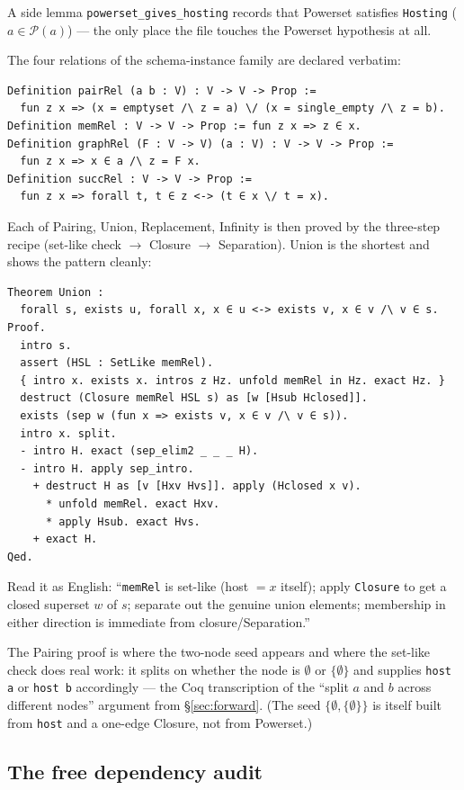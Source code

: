 \documentclass[11pt]{article}
\theoremstyle{plain}
\theoremstyle{definition}
\newcommand{\Pow}{\mathcal{P}}
\newcommand{\cq}[1]{\lstinline[basicstyle=\ttfamily]|#1|}
\begin{document}
A side lemma \cq{powerset_gives_hosting} records that Powerset satisfies
\cq{Hosting} ($a \in \Pow(a)$) --- the only place the file touches the Powerset
hypothesis at all.

The four relations of the schema-instance family are declared verbatim:

\begin{lstlisting}
Definition pairRel (a b : V) : V -> V -> Prop :=
  fun z x => (x = emptyset /\ z = a) \/ (x = single_empty /\ z = b).
Definition memRel : V -> V -> Prop := fun z x => z ∈ x.
Definition graphRel (F : V -> V) (a : V) : V -> V -> Prop :=
  fun z x => x ∈ a /\ z = F x.
Definition succRel : V -> V -> Prop :=
  fun z x => forall t, t ∈ z <-> (t ∈ x \/ t = x).
\end{lstlisting}

Each of Pairing, Union, Replacement, Infinity is then proved by the three-step
recipe (set-like check $\to$ Closure $\to$ Separation). Union is the shortest and
shows the pattern cleanly:

\begin{lstlisting}
Theorem Union :
  forall s, exists u, forall x, x ∈ u <-> exists v, x ∈ v /\ v ∈ s.
Proof.
  intro s.
  assert (HSL : SetLike memRel).
  { intro x. exists x. intros z Hz. unfold memRel in Hz. exact Hz. }
  destruct (Closure memRel HSL s) as [w [Hsub Hclosed]].
  exists (sep w (fun x => exists v, x ∈ v /\ v ∈ s)).
  intro x. split.
  - intro H. exact (sep_elim2 _ _ _ H).
  - intro H. apply sep_intro.
    + destruct H as [v [Hxv Hvs]]. apply (Hclosed x v).
      * unfold memRel. exact Hxv.
      * apply Hsub. exact Hvs.
    + exact H.
Qed.
\end{lstlisting}

Read it as English: ``\cq{memRel} is set-like (host $= x$ itself); apply
\cq{Closure} to get a closed superset $w$ of $s$; separate out the genuine union
elements; membership in either direction is immediate from
closure/Separation.''

The Pairing proof is where the two-node seed appears and where the set-like check
does real work: it splits on whether the node is $\emptyset$ or $\{\emptyset\}$ and
supplies \cq{host a} or \cq{host b} accordingly --- the Coq transcription of the
``split $a$ and $b$ across different nodes'' argument from \S\ref{sec:forward}. (The
seed $\{\emptyset,\{\emptyset\}\}$ is itself built from \cq{host} and a one-edge
Closure, not from Powerset.)

\subsection{The free dependency audit}
\end{document}
